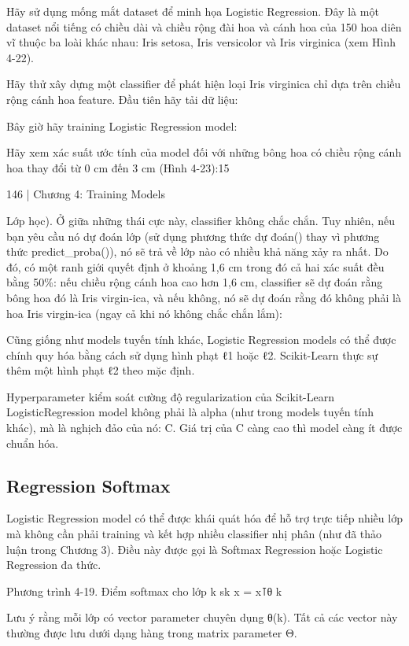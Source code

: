 Hãy sử dụng mống mắt dataset để minh họa Logistic Regression. Đây là một dataset nổi tiếng có chiều dài và chiều rộng đài hoa và cánh hoa của 150 hoa diên vĩ thuộc ba loài khác nhau: Iris setosa, Iris versicolor và Iris virginica (xem Hình 4-22).

Hãy thử xây dựng một classifier để phát hiện loại Iris virginica chỉ dựa trên chiều rộng cánh hoa feature. Đầu tiên hãy tải dữ liệu:

Bây giờ hãy training Logistic Regression model:

Hãy xem xác suất ước tính của model đối với những bông hoa có chiều rộng cánh hoa thay đổi từ 0 cm đến 3 cm (Hình 4-23):15

146 | Chương 4: Training Models

Lớp học). Ở giữa những thái cực này, classifier không chắc chắn. Tuy nhiên, nếu bạn yêu cầu nó dự đoán lớp (sử dụng phương thức dự đoán() thay vì phương thức predict\_proba()), nó sẽ trả về lớp nào có nhiều khả năng xảy ra nhất. Do đó, có một ranh giới quyết định ở khoảng 1,6 cm trong đó cả hai xác suất đều bằng 50\%: nếu chiều rộng cánh hoa cao hơn 1,6 cm, classifier sẽ dự đoán rằng bông hoa đó là Iris virgin-ica, và nếu không, nó sẽ dự đoán rằng đó không phải là hoa Iris virgin-ica (ngay cả khi nó không chắc chắn lắm):

Cũng giống như models tuyến tính khác, Logistic Regression models có thể được chính quy hóa bằng cách sử dụng hình phạt ℓ1 hoặc ℓ2. Scikit-Learn thực sự thêm một hình phạt ℓ2 theo mặc định.

Hyperparameter kiểm soát cường độ regularization của Scikit-Learn LogisticRegression model không phải là alpha (như trong models tuyến tính khác), mà là nghịch đảo của nó: C. Giá trị của C càng cao thì model càng ít được chuẩn hóa.

\subsection{Regression Softmax}

Logistic Regression model có thể được khái quát hóa để hỗ trợ trực tiếp nhiều lớp mà không cần phải training và kết hợp nhiều classifier nhị phân (như đã thảo luận trong Chương 3). Điều này được gọi là Softmax Regression hoặc Logistic Regression đa thức.

Phương trình 4-19. Điểm softmax cho lớp k sk x = x⊺θ k

Lưu ý rằng mỗi lớp có vector parameter chuyên dụng θ(k). Tất cả các vector này thường được lưu dưới dạng hàng trong matrix parameter Θ.

